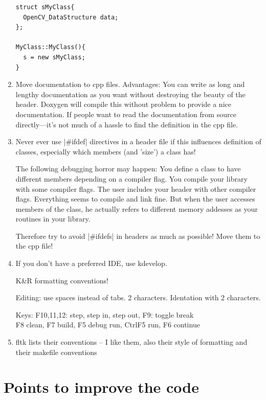 \begin{enumerate}
\begin{code}
\begin{verbatim}
struct sMyClass{
  OpenCV_DataStructure data;
};

MyClass::MyClass(){
  s = new sMyClass;
}
\end{verbatim}
\end{code}

\item Move documentation to cpp files. Advantages: You can write as
  long and lengthy documentation as you want without destroying the
  beauty of the header. Doxygen will compile this without problem to
  provide a nice documentation. If people want to read the
  documentation from source directly---it's not much of a hassle to
  find the definition in the cpp file.


\item Never ever use |#ifdef| directives in a header file if this
  influences definition of classes, especially which members (and
  'size') a class has!

  The following debugging horror may happen: You define a class to
  have different members depending on a compiler flag. You compile
  your library with some compiler flags. The user includes your header
  with other compiler flags. Everything seems to compile and link
  fine. But when the user accesses members of the class, he actually
  refers to different memory addesses as your routines in your
  library.

  Therefore try to avoid |#ifdefs| in headers as much as possible! Move
  them to the cpp file!

\item If you don't have a preferred IDE, use kdevelop.

  K\&R formatting conventions!

  Editing: use spaces instead of tabs. 2 characters. Identation with 2
  characters.

  Keys: F10,11,12: step, step in, step out, F9: toggle break\\
  F8 clean, F7 build, F5 debug run, CtrlF5 run, F6 continue


\item fltk lists their conventions -- I like them, also
  their style of formatting and their makefile conventions

\end{enumerate}


\section{Points to improve the code}

